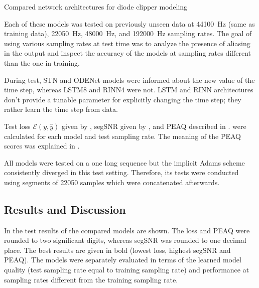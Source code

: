 \begin{table}[]
    \caption{Compared network architectures for diode clipper modeling}
    
    \label{tab:diode_clipper_models_data}
\end{table}

Each of these models was tested on previously unseen data at \SI{44100}{Hz} (same as training data), \SI{22050}{Hz}, \SI{48000}{Hz}, and \SI{192000}{Hz} sampling rates. The goal of using various sampling rates at test time was to analyze the presence of aliasing in the output and inspect the accuracy of the models at sampling rates different than the one in training. 

During test, \ac{STN} and ODENet models were informed about the new value of the time step, whereas \ac{LSTM}8 and \ac{RINN}4 were not. \ac{LSTM} and \ac{RINN} architectures don't provide a tunable parameter for explicitly changing the time step; they rather learn the time step from data.

Test loss $\mathcal{E}(y, \hat{y})$ given by , \ac{segSNR} given by , and \ac{PEAQ} described in .
were calculated for each model and test sampling rate. The meaning of the \ac{PEAQ} scores was explained in .

All models were tested on a one long sequence but the implicit Adams scheme consistently diverged in this test setting. Therefore, its tests were conducted using segments of 22050 samples which were concatenated afterwards.

\subsection{Results and Discussion}
\label{sec:diode_clipper_results}

In  the test results of the compared models are shown. The loss and \ac{PEAQ} were rounded to two significant digits, whereas \ac{segSNR} was rounded to one decimal place. The best results are given in bold (lowest loss, highest \ac{segSNR} and \ac{PEAQ}). The models were separately evaluated in terms of the learned model quality (test sampling rate equal to training sampling rate) and performance at sampling rates different from the training sampling rate. 

